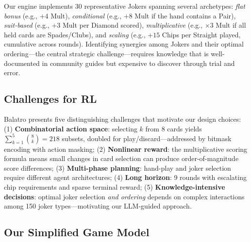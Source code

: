 \documentclass[conference]{IEEEtran}
\begin{document}
Our engine implements 30 representative Jokers spanning several archetypes:
\textit{flat bonus} (e.g., $+4$ Mult),
\textit{conditional} (e.g., $+8$ Mult if the hand contains a Pair),
\textit{suit-based} (e.g., $+3$ Mult per Diamond scored),
\textit{multiplicative} (e.g., $\times 3$ Mult if all held cards are Spades/Clubs), and
\textit{scaling} (e.g., $+15$ Chips per Straight played, cumulative across rounds).
Identifying synergies among Jokers and their optimal ordering---the central strategic challenge---requires knowledge that is well-documented in community guides but expensive to discover through trial and error.

\subsection{Challenges for RL}

Balatro presents five distinguishing challenges that motivate our design choices:
(1) \textbf{Combinatorial action space}: selecting $k$ from 8 cards yields $\sum_{k=1}^{5}\binom{8}{k} = 218$ subsets, doubled for play/discard---addressed by bitmask encoding with action masking;
(2) \textbf{Nonlinear reward}: the multiplicative scoring formula means small changes in card selection can produce order-of-magnitude score differences;
(3) \textbf{Multi-phase planning}: hand-play and joker selection require different agent architectures;
(4) \textbf{Long horizon}: 9 rounds with escalating chip requirements and sparse terminal reward;
(5) \textbf{Knowledge-intensive decisions}: optimal joker selection \textit{and ordering} depends on complex interactions among 150 joker types---motivating our LLM-guided approach.

\subsection{Our Simplified Game Model}
\end{document}
